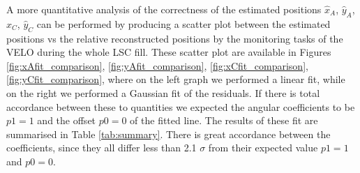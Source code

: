 A more quantitative analysis of the correctness of the estimated positions $\hat{x}_A$, $\hat{y}_{A}$, $\hat{x}_C$, $\hat{y}_C$ can be performed by producing a scatter plot between the estimated positions vs the relative reconstructed positions by the monitoring tasks of the VELO during the whole LSC fill. These scatter plot are available in Figures \ref{fig:xAfit_comparison}, \ref{fig:yAfit_comparison}, \ref{fig:xCfit_comparison}, \ref{fig:yCfit_comparison}, where on the left graph we performed a linear fit, while on the right we performed a Gaussian fit of the residuals. If there is total accordance between these to quantities we expected the angular coefficients to be $p1=1$ and the offset $p0=0$ of the fitted line. 
The results of these fit are summarised in Table \ref{tab:summary}. There is great accordance between the coefficients, since they all differ less than 2.1 $\sigma$ from their expected value $p1=1$ and $p0=0$. 


